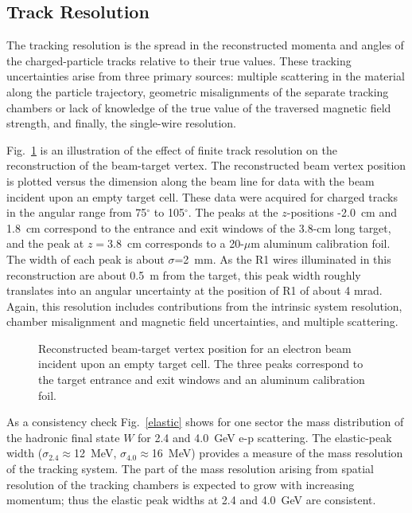 \subsection{Track Resolution}

\hskip 0.15in
The tracking resolution is the spread in the reconstructed
momenta and angles of the charged-particle tracks relative to their true values.
These tracking uncertainties arise from three primary sources: multiple scattering 
in the material along the particle trajectory, geometric misalignments of the separate 
tracking chambers or lack of knowledge 
of the true value of the traversed magnetic field strength, and finally, the  
single-wire resolution.  

Fig.~\ref{zvertex} is an illustration of the effect of finite track resolution
on the reconstruction of the beam-target vertex.
The reconstructed beam
vertex position is plotted versus the dimension along the beam
line for data with the beam incident upon an empty 
target cell.  These data were acquired for charged tracks in the angular range from 
75$^{\circ}$ to 105$^{\circ}$.  The peaks at the $z$-positions -2.0~cm and 1.8~cm 
correspond to the entrance and exit windows of the 3.8-cm long target, and the peak 
at $z=3.8$~cm corresponds to a 20-$\mu$m aluminum calibration foil.  The width of 
each peak is about $\sigma$=2~mm.  As the R1 wires illuminated in this reconstruction 
are about 0.5~m from the target, this peak width roughly translates into an angular 
uncertainty at the position of R1 of about 4 mrad.  Again, this resolution includes
contributions from the intrinsic system resolution, chamber misalignment and magnetic
field uncertainties, and multiple scattering.
  
\begin{figure}[htpb]
\vspace{5cm} 
\caption{\small{Reconstructed beam-target vertex position for an electron beam
incident upon an empty target cell.  The three peaks correspond to the
target entrance and exit windows and an aluminum calibration foil.}}
\label{zvertex}
\end{figure}


As a consistency check Fig.~\ref{elastic} shows for one sector the mass 
distribution of the hadronic final state $W$ for 2.4 and 4.0~GeV e-p scattering.
The elastic-peak width ($\sigma_{2.4} \approx$12~MeV, $\sigma_{4.0} 
\approx$16~MeV) provides a measure of the mass resolution of the tracking system.
The part of the mass resolution arising from spatial resolution of the tracking
chambers is expected to grow with increasing momentum; thus the
elastic peak widths at 2.4 and 4.0~GeV are consistent.

